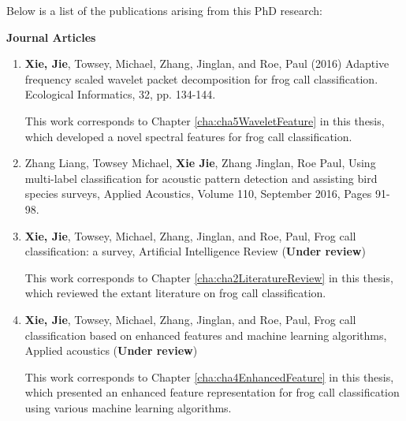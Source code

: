 Below is a list of the publications arising from this PhD research:


{\textbf{Journal Articles}}
\begin{enumerate} 
\item	\textbf{Xie, Jie}, Towsey, Michael, Zhang, Jinglan, and Roe, Paul (2016) Adaptive frequency scaled wavelet packet decomposition for frog call classification.  Ecological Informatics, 32, pp. 134-144.

This work corresponds to Chapter \ref{cha:cha5WaveletFeature} in this thesis, which developed a novel spectral features for frog call classification.

\item	Zhang Liang, Towsey Michael, \textbf{Xie Jie}, Zhang Jinglan, Roe Paul,  Using multi-label classification for acoustic pattern detection and assisting bird species surveys, Applied Acoustics, Volume 110, September 2016, Pages 91-98.

\item \textbf{Xie, Jie}, Towsey, Michael, Zhang, Jinglan, and Roe, Paul, Frog call classification: a survey, Artificial Intelligence Review (\textbf{Under review})


This work corresponds to Chapter \ref{cha:cha2LiteratureReview} in this thesis, which reviewed the extant literature on frog call classification.


\item  \textbf{Xie, Jie}, Towsey, Michael, Zhang, Jinglan, and Roe, Paul, Frog call classification based on enhanced features and machine learning algorithms, Applied acoustics (\textbf{Under review})

This work corresponds to Chapter \ref{cha:cha4EnhancedFeature} in this thesis, which presented an enhanced feature representation for frog call classification using various machine learning algorithms.


\end{enumerate}


